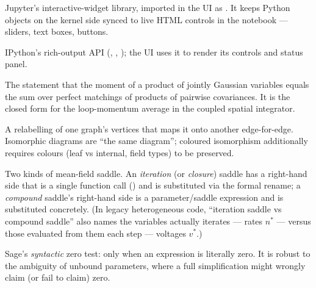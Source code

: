 \begin{description}[leftmargin=0pt,style=nextline]
  \item[\code{ipywidgets}] Jupyter's interactive-widget library, imported in the UI
        as . It keeps Python objects on the kernel side synced to live HTML
        controls in the notebook --- sliders, text boxes, buttons.

  \item[IPython.display] IPython's rich-output API (, ,
        ); the UI uses it to render its controls and status panel.

  \item[Isserlis / Wick theorem] The statement that the moment of a product of
        jointly Gaussian variables equals the sum over perfect matchings of products
        of pairwise covariances. It is the closed form for the loop-momentum average
        in the coupled spatial integrator.

  \item[Isomorphism (of graphs)] A relabelling of one graph's vertices that maps it
        onto another edge-for-edge. Isomorphic diagrams are ``the same diagram'';
        coloured isomorphism additionally requires colours (leaf vs internal, field
        types) to be preserved.

  \item[Iteration vs compound saddle] Two kinds of mean-field saddle. An
        \emph{iteration} (or \emph{closure}) saddle has a right-hand side that is a
        single function call () and is substituted via the
        formal rename; a \emph{compound} saddle's right-hand side is a
        parameter/saddle expression and is substituted concretely. (In legacy
        heterogeneous code, ``iteration saddle vs compound saddle'' also names the
        variables  actually iterates --- rates $n^{*}$ --- versus those
        evaluated from them each step --- voltages $v^{*}$.)

  \item[\code{is\_trivial\_zero()}] Sage's \emph{syntactic} zero test: 
        only when an expression is literally zero. It is robust to the ambiguity of
        unbound parameters, where a full simplification might wrongly claim (or fail
        to claim) zero.

\end{description}

